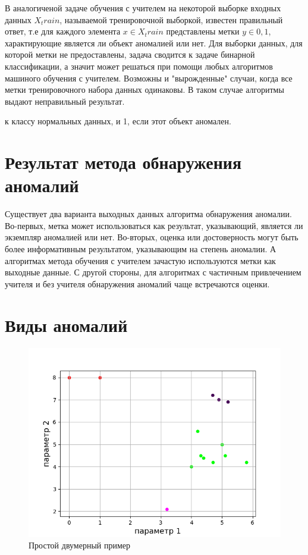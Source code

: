 В аналогиченой задаче обучения с учителем на некоторой выборке входных данных $X_train$, называемой тренировочной выборкой, известен правильный ответ, т.е для каждого элемента $x \in X_train$ представлены метки $ y \in {0,1} $, характирующие является ли объект аномалией или нет. Для выборки данных, для которой метки не предоставлены, задача сводится к задаче бинарной классификации, а значит может решаться при помощи любых алгоритмов  машиного обучения с учителем. Возможны и "вырожденные" случаи, когда все метки тренировочного набора данных одинаковы. В таком случае алгоритмы выдают неправильный результат.

к классу нормальных данных, и 1, если этот объект аномален.
\section{Результат метода обнаружения аномалий}
Существует два варианта выходных данных алгоритма обнаружения аномалии. Во-первых, метка может использоваться как результат, указывающий, является ли экземпляр аномалией или нет. Во-вторых, оценка или достоверность могут быть более информативным результатом, указывающим на степень аномалии. А алгоритмах метода обучения с учителем зачастую используются метки как выходные данные. С другой стороны, для алгоритмах  с частичным привлечением учителя и без учителя  обнаружения аномалий чаще встречаются оценки.
\section{Виды аномалий}
\begin{figure}
	\centering
	\includegraphics[width=.5\textwidth]{img/1.png}
	\caption{Простой двумерный пример}
	\label{fig01}
\end{figure}

